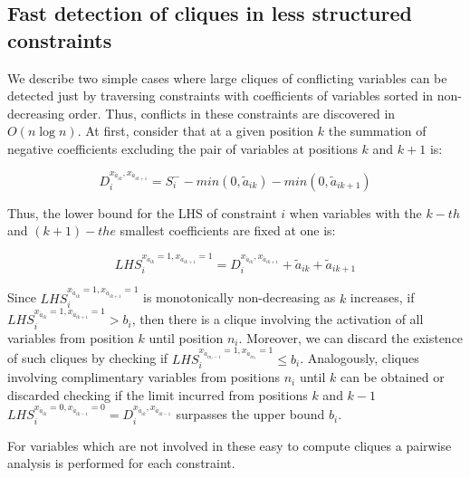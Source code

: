 \documentclass{endm}
\begin{document}
\subsection{Fast detection of cliques in less structured constraints}

We describe two simple cases where large cliques of conflicting variables can be detected just by traversing constraints with  coefficients of variables sorted in non-decreasing order. Thus, conflicts in these constraints are discovered in $O( n \log n)$. At first, consider that at a given position $k$ the summation of negative coefficients excluding the pair of variables at positions $k$ and $k+1$ is: 

\begin{equation}\label{di}
D_{i}^{x_{\acute{a}_{ik}}, x_{\acute{a}_{ik+1}}} = S_i^- - min(0, \tilde{a}_{ik}) - min(0, \tilde{a}_{ik+1})
\end{equation}

\noindent Thus, the lower bound for the LHS of constraint $i$ when variables with the $k-th$ and $(k+1)-the$ smallest coefficients are fixed at one is:

\begin{equation}
LHS_{i}^{x_{\acute{a}_{ik}} = 1, x_{\acute{a}_{ik+1}} = 1} = D_{i}^{x_{\acute{a}_{ik}}, x_{\acute{a}_{ik+1}}} + \tilde{a}_{ik} + \tilde{a}_{ik+1}
\end{equation}

Since $LHS_{i}^{x_{\acute{a}_{ik}} = 1, x_{\acute{a}_{ik+1}} = 1}$ is monotonically non-decreasing as $k$ increases, if $LHS_{i}^{x_{\acute{a}_{ik}} = 1, x_{\acute{a}_{ik+1}} = 1} > b_{i}$, then there is a clique involving the activation of all variables from position $k$ until position $n_i$. Moreover, we can discard the existence of such cliques by checking if $LHS_{i}^{x_{\acute{a}_{in_i-1}} = 1, x_{\acute{a}_{in_i}} = 1} \leq b_i$. Analogously, cliques involving complimentary variables from positions $n_i$ until $k$ can be obtained or discarded checking if the limit incurred from positions $k$ and $k-1$  $LHS_{i}^{x_{\acute{a}_{ik}} = 0, x_{\acute{a}_{ik-1}} = 0} = D_{i}^{x_{\acute{a}_{ik}}, x_{\acute{a}_{ik-1}}} $ surpasses the upper bound $b_i$.

For variables which are not involved in these easy to compute cliques a pairwise analysis is performed for each constraint. 
\end{document}
